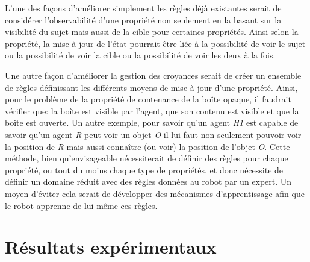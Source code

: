 \documentclass[a4paper,11pt,twoside]{StyleThese}
\begin{document}
L'une des façons d'améliorer simplement les règles déjà existantes serait de considérer l'observabilité d'une propriété non seulement en la basant sur la visibilité du sujet mais aussi de la cible pour certaines propriétés. Ainsi selon la propriété, la mise à jour de l'état pourrait être liée à la possibilité de voir le sujet ou la possibilité de voir la cible ou la possibilité de voir les deux à la fois.

Une autre façon d'améliorer la gestion des croyances serait de créer un ensemble de règles définissant les différents moyens de mise à jour d'une propriété.
Ainsi, pour le problème de la propriété de contenance de la boîte opaque, il faudrait vérifier que: la boîte est visible par l'agent, que son contenu est visible et que la boîte est ouverte.
Un autre exemple, pour savoir qu'un agent \textit{H1} est capable de savoir qu'un agent \textit{R} peut voir un objet \textit{O} il lui faut non seulement pouvoir voir la position de \textit{R} mais aussi connaître (ou voir) la position de l'objet \textit{O}.
Cette méthode, bien qu'envisageable nécessiterait de définir des règles pour chaque propriété, ou tout du moins chaque type de propriétés, et donc nécessite de définir un domaine réduit avec des règles données au robot par un expert.
Un moyen d'éviter cela serait de développer des mécanismes d'apprentissage afin que le robot apprenne de lui-même ces règles.






\section{Résultats expérimentaux}
\end{document}
